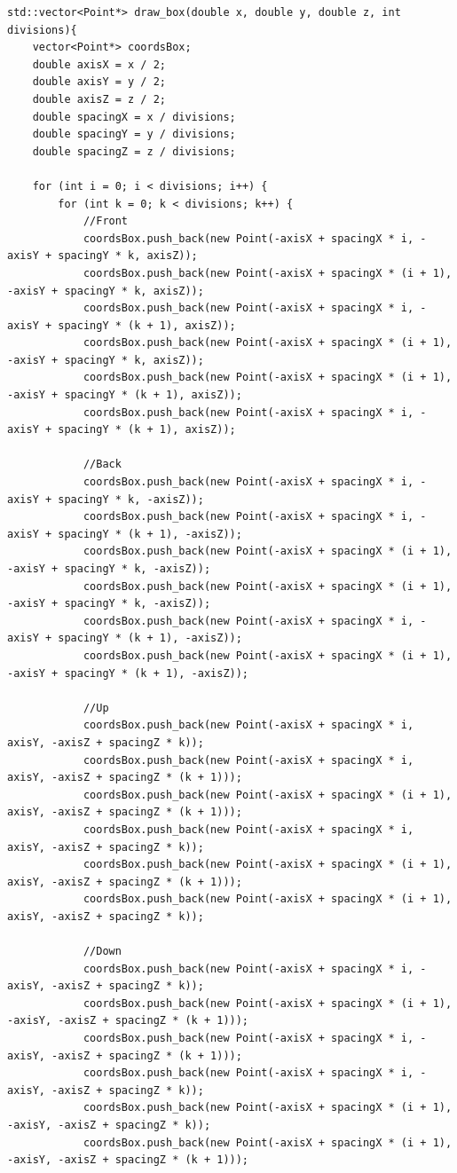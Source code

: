 \documentclass[a4paper]{article}
\begin{document}
\begin{lstlisting}
std::vector<Point*> draw_box(double x, double y, double z, int divisions){
    vector<Point*> coordsBox;
    double axisX = x / 2;
    double axisY = y / 2;
    double axisZ = z / 2;
    double spacingX = x / divisions;
    double spacingY = y / divisions;
    double spacingZ = z / divisions;

    for (int i = 0; i < divisions; i++) {
        for (int k = 0; k < divisions; k++) {
            //Front
            coordsBox.push_back(new Point(-axisX + spacingX * i, -axisY + spacingY * k, axisZ));
            coordsBox.push_back(new Point(-axisX + spacingX * (i + 1), -axisY + spacingY * k, axisZ));
            coordsBox.push_back(new Point(-axisX + spacingX * i, -axisY + spacingY * (k + 1), axisZ));
            coordsBox.push_back(new Point(-axisX + spacingX * (i + 1), -axisY + spacingY * k, axisZ));
            coordsBox.push_back(new Point(-axisX + spacingX * (i + 1), -axisY + spacingY * (k + 1), axisZ));
            coordsBox.push_back(new Point(-axisX + spacingX * i, -axisY + spacingY * (k + 1), axisZ));

            //Back
            coordsBox.push_back(new Point(-axisX + spacingX * i, -axisY + spacingY * k, -axisZ));
            coordsBox.push_back(new Point(-axisX + spacingX * i, -axisY + spacingY * (k + 1), -axisZ));
            coordsBox.push_back(new Point(-axisX + spacingX * (i + 1), -axisY + spacingY * k, -axisZ));
            coordsBox.push_back(new Point(-axisX + spacingX * (i + 1), -axisY + spacingY * k, -axisZ));
            coordsBox.push_back(new Point(-axisX + spacingX * i, -axisY + spacingY * (k + 1), -axisZ));
            coordsBox.push_back(new Point(-axisX + spacingX * (i + 1), -axisY + spacingY * (k + 1), -axisZ));

            //Up
            coordsBox.push_back(new Point(-axisX + spacingX * i, axisY, -axisZ + spacingZ * k));
            coordsBox.push_back(new Point(-axisX + spacingX * i, axisY, -axisZ + spacingZ * (k + 1)));
            coordsBox.push_back(new Point(-axisX + spacingX * (i + 1), axisY, -axisZ + spacingZ * (k + 1)));
            coordsBox.push_back(new Point(-axisX + spacingX * i, axisY, -axisZ + spacingZ * k));
            coordsBox.push_back(new Point(-axisX + spacingX * (i + 1), axisY, -axisZ + spacingZ * (k + 1)));
            coordsBox.push_back(new Point(-axisX + spacingX * (i + 1), axisY, -axisZ + spacingZ * k));

            //Down
            coordsBox.push_back(new Point(-axisX + spacingX * i, -axisY, -axisZ + spacingZ * k));
            coordsBox.push_back(new Point(-axisX + spacingX * (i + 1), -axisY, -axisZ + spacingZ * (k + 1)));
            coordsBox.push_back(new Point(-axisX + spacingX * i, -axisY, -axisZ + spacingZ * (k + 1)));
            coordsBox.push_back(new Point(-axisX + spacingX * i, -axisY, -axisZ + spacingZ * k));
            coordsBox.push_back(new Point(-axisX + spacingX * (i + 1), -axisY, -axisZ + spacingZ * k));
            coordsBox.push_back(new Point(-axisX + spacingX * (i + 1), -axisY, -axisZ + spacingZ * (k + 1)));


\end{lstlisting}
\end{document}
